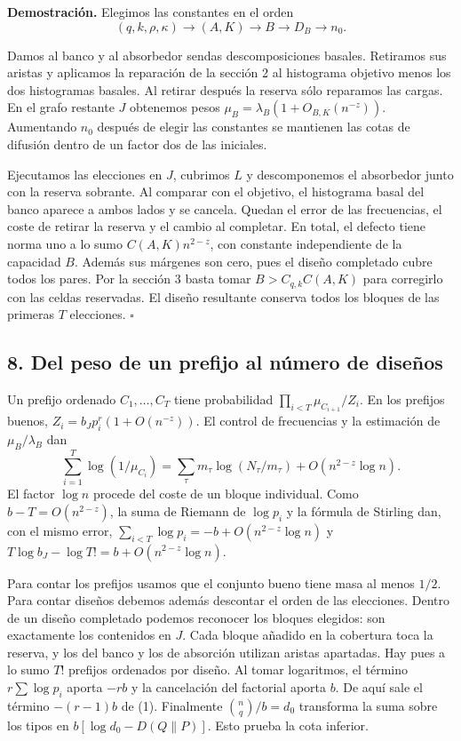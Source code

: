 \documentclass[spanish,11pt,a4paper]{article}
\begin{document}
\textbf{Demostración.} Elegimos las constantes en el orden \[(q,k,\rho,\kappa)\longrightarrow(A,K)\longrightarrow B\longrightarrow D_B\longrightarrow n_0.\]

Damos al banco y al absorbedor sendas descomposiciones basales. Retiramos sus aristas y aplicamos la reparación de la sección 2 al histograma objetivo menos los dos histogramas basales. Al retirar después la reserva sólo reparamos las cargas. En el grafo restante \(J\) obtenemos pesos \(\mu_B=\lambda_B(1+O_{B,K}(n^{-z}))\). Aumentando \(n_0\) después de elegir las constantes se mantienen las cotas de difusión dentro de un factor dos de las iniciales.

Ejecutamos las elecciones en \(J\), cubrimos \(L\) y descomponemos el absorbedor junto con la reserva sobrante. Al comparar con el objetivo, el histograma basal del banco aparece a ambos lados y se cancela. Quedan el error de las frecuencias, el coste de retirar la reserva y el cambio al completar. En total, el defecto tiene norma uno a lo sumo \(C(A,K)n^{2-z}\), con constante independiente de la capacidad \(B\). Además sus márgenes son cero, pues el diseño completado cubre todos los pares. Por la sección 3 basta tomar \(B>C_{q,k}C(A,K)\) para corregirlo con las celdas reservadas. El diseño resultante conserva todos los bloques de las primeras \(T\) elecciones. \(\square\)

\subsection{8. Del peso de un prefijo al número de diseños}\label{del-peso-de-un-prefijo-al-nuxfamero-de-diseuxf1os}

Un prefijo ordenado \(C_1,\ldots,C_T\) tiene probabilidad \(\prod_{i<T}\mu_{C_{i+1}}/Z_i\). En los prefijos buenos, \(Z_i=b_Jp_i^r(1+O(n^{-z}))\). El control de frecuencias y la estimación de \(\mu_B/\lambda_B\) dan \[\sum_{i=1}^T \log(1/\mu_{C_i})
 =\sum_\tau m_\tau\log(N_\tau/m_\tau)+O(n^{2-z}\log n).\] El factor \(\log n\) procede del coste de un bloque individual. Como \(b-T=O(n^{2-z})\), la suma de Riemann de \(\log p_i\) y la fórmula de Stirling dan, con el mismo error, \(\sum_{i<T}\log p_i=-b+O(n^{2-z}\log n)\) y \(T\log b_J-\log T!=b+O(n^{2-z}\log n)\).

Para contar los prefijos usamos que el conjunto bueno tiene masa al menos \(1/2\). Para contar diseños debemos además descontar el orden de las elecciones. Dentro de un diseño completado podemos reconocer los bloques elegidos: son exactamente los contenidos en \(J\). Cada bloque añadido en la cobertura toca la reserva, y los del banco y los de absorción utilizan aristas apartadas. Hay pues a lo sumo \(T!\) prefijos ordenados por diseño. Al tomar logaritmos, el término \(r\sum\log p_i\) aporta \(-rb\) y la cancelación del factorial aporta \(b\). De aquí sale el término \(-(r-1)b\) de (1). Finalmente \(\binom nq/b=d_0\) transforma la suma sobre los tipos en \(b[\log d_0-D(Q\|P)]\). Esto prueba la cota inferior.
\end{document}
